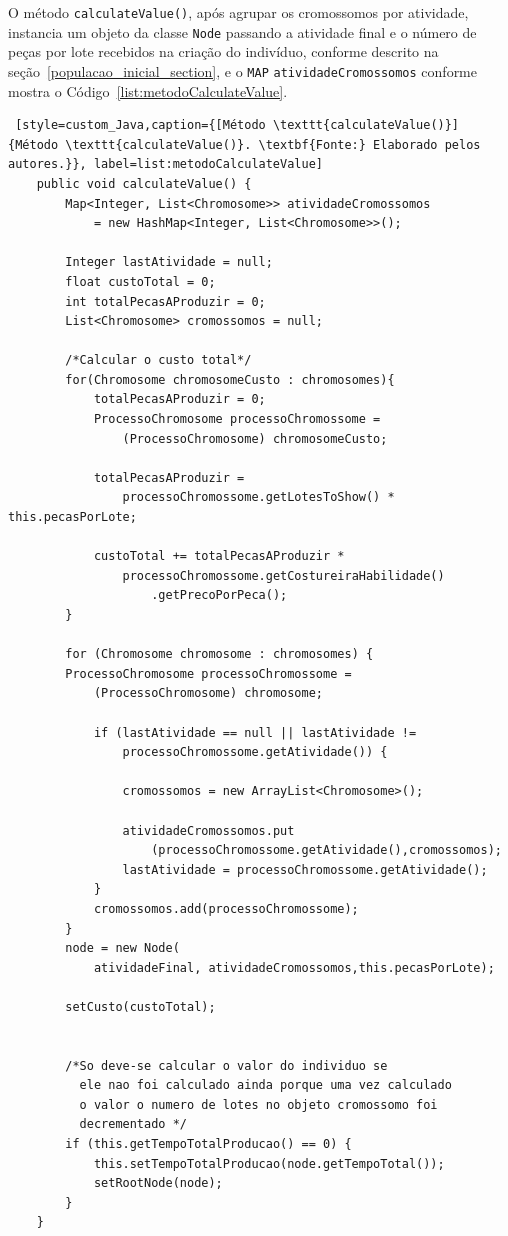 \par O método \texttt{calculateValue()}, após agrupar os cromossomos por atividade, 
 instancia um objeto da classe \texttt{Node} passando a atividade final e o número de 
 peças por lote recebidos na criação do indivíduo, conforme descrito na seção~\ref{populacao_inicial_section}, e o \texttt{MAP} 
 \texttt{atividadeCromossomos} conforme mostra o Código~\ref{list:metodoCalculateValue}.


\begin{lstlisting} [style=custom_Java,caption={[Método \texttt{calculateValue()}]
{Método \texttt{calculateValue()}. \textbf{Fonte:} Elaborado pelos autores.}}, label=list:metodoCalculateValue]
	public void calculateValue() {
		Map<Integer, List<Chromosome>> atividadeCromossomos 
			= new HashMap<Integer, List<Chromosome>>();
		
		Integer lastAtividade = null;
		float custoTotal = 0;
		int totalPecasAProduzir = 0;
		List<Chromosome> cromossomos = null;
		
		/*Calcular o custo total*/
		for(Chromosome chromosomeCusto : chromosomes){
			totalPecasAProduzir = 0;
			ProcessoChromosome processoChromossome = 
				(ProcessoChromosome) chromosomeCusto;
				
			totalPecasAProduzir = 
				processoChromossome.getLotesToShow() * this.pecasPorLote;
				
			custoTotal += totalPecasAProduzir * 
				processoChromossome.getCostureiraHabilidade()
					.getPrecoPorPeca();
		}
		
		for (Chromosome chromosome : chromosomes) {
		ProcessoChromosome processoChromossome = 
			(ProcessoChromosome) chromosome;
		
			if (lastAtividade == null || lastAtividade != 
				processoChromossome.getAtividade()) {
				
				cromossomos = new ArrayList<Chromosome>();
				
				atividadeCromossomos.put
					(processoChromossome.getAtividade(),cromossomos);
				lastAtividade = processoChromossome.getAtividade();
			}
			cromossomos.add(processoChromossome);
		}
		node = new Node(
			atividadeFinal, atividadeCromossomos,this.pecasPorLote);
		
		setCusto(custoTotal);
		
		
		/*So deve-se calcular o valor do individuo se 
		  ele nao foi calculado ainda porque uma vez calculado 
		  o valor o numero de lotes no objeto cromossomo foi 
		  decrementado */
		if (this.getTempoTotalProducao() == 0) {
			this.setTempoTotalProducao(node.getTempoTotal());
			setRootNode(node);
		}
	}

\end{lstlisting}


